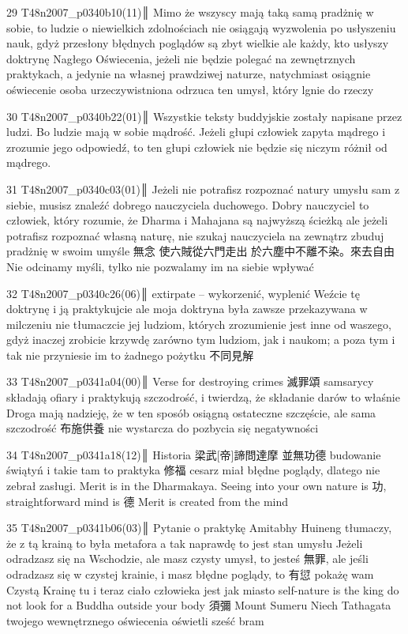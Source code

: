 29 T48n2007_p0340b10(11)║
Mimo że wszyscy mają taką samą pradżnię w sobie, to ludzie o niewielkich zdolnościach nie osiągają wyzwolenia po usłyszeniu nauk, gdyż przesłony błędnych poglądów są zbyt wielkie
ale każdy, kto usłyszy doktrynę Nagłego Oświecenia, jeżeli nie będzie polegać na zewnętrznych praktykach, a jedynie na własnej prawdziwej naturze, natychmiast osiągnie oświecenie
osoba urzeczywistniona odrzuca ten umysł, który lgnie do rzeczy

30 T48n2007_p0340b22(01)║
Wszystkie teksty buddyjskie zostały napisane przez ludzi. Bo ludzie mają w sobie mądrość. Jeżeli głupi człowiek zapyta mądrego i zrozumie jego odpowiedź, to ten głupi człowiek nie będzie się niczym różnił od mądrego.

31 T48n2007_p0340c03(01)║
Jeżeli nie potrafisz rozpoznać natury umysłu sam z siebie, musisz znaleźć dobrego nauczyciela duchowego.
Dobry nauczyciel to człowiek, który rozumie, że Dharma i Mahajana są najwyższą ścieżką
ale jeżeli potrafisz rozpoznać własną naturę, nie szukaj nauczyciela na zewnątrz
zbuduj pradżnię w swoim umyśle
無念 使六賊從六門走出
於六塵中不離不染。來去自由
Nie odcinamy myśli, tylko nie pozwalamy im na siebie wpływać

32 T48n2007_p0340c26(06)║
extirpate – wykorzenić, wyplenić
Weźcie tę doktrynę i ją praktykujcie
ale moja doktryna była zawsze przekazywana w milczeniu
nie tłumaczcie jej ludziom, których zrozumienie jest inne od waszego, gdyż inaczej zrobicie krzywdę zarówno tym ludziom, jak i naukom; a poza tym i tak nie przyniesie im to żadnego pożytku
不同見解

33 T48n2007_p0341a04(00)║
Verse for destroying crimes 滅罪頌
samsarycy składają ofiary i praktykują szczodrość, i twierdzą, że składanie darów to właśnie Droga
mają nadzieję, że w ten sposób osiągną ostateczne szczęście, ale sama szczodrość 布施供養 nie wystarcza do pozbycia się negatywności

34 T48n2007_p0341a18(12)║
Historia 梁武[帝]諦問達摩
並無功德
budowanie świątyń i takie tam to praktyka 修福
cesarz miał błędne poglądy, dlatego nie zebrał zasługi. Merit is in the Dharmakaya. Seeing into your own nature is 功, straightforward mind is 德
Merit is created from the mind

35 T48n2007_p0341b06(03)║
Pytanie o praktykę Amitabhy
Huineng tłumaczy, że z tą krainą to była metafora
a tak naprawdę to jest stan umysłu
Jeżeli odradzasz się na Wschodzie, ale masz czysty umysł, to jesteś 無罪, ale jeśli odradzasz się w czystej krainie, i masz błędne poglądy, to 有愆
pokażę wam Czystą Krainę tu i teraz
ciało człowieka jest jak miasto
self-nature is the king
do not look for a Buddha outside your body
須彌 Mount Sumeru
Niech Tathagata twojego wewnętrznego oświecenia oświetli sześć bram

